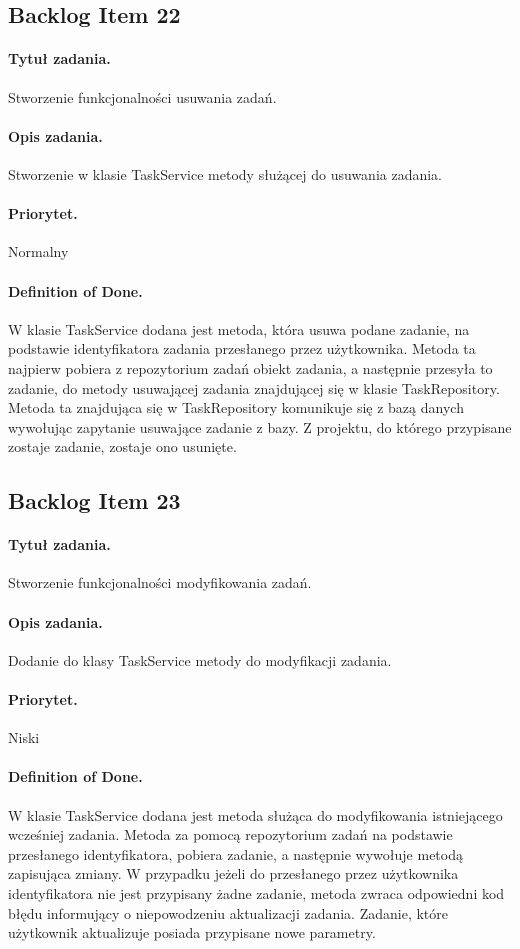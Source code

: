 ﻿\documentclass[a4paper]{article}
\begin{document}
\subsection{Backlog Item 22} 
\paragraph{Tytuł zadania.}  Stworzenie funkcjonalności usuwania zadań.
\paragraph{Opis zadania.} Stworzenie w klasie TaskService metody służącej do usuwania zadania. 
\paragraph{Priorytet.} Normalny
\paragraph{Definition of Done.} W klasie TaskService dodana jest metoda, która usuwa podane zadanie, na podstawie identyfikatora zadania przesłanego przez użytkownika. Metoda ta najpierw pobiera z repozytorium zadań obiekt zadania, a następnie przesyła to zadanie, do metody usuwającej zadania znajdującej się w klasie TaskRepository. Metoda ta znajdująca się w TaskRepository komunikuje się z bazą danych wywołując zapytanie usuwające zadanie z bazy. Z projektu, do którego przypisane zostaje zadanie, zostaje ono usunięte.

\subsection{Backlog Item 23} 
\paragraph{Tytuł zadania.} Stworzenie funkcjonalności modyfikowania zadań.
\paragraph{Opis zadania.} Dodanie do klasy TaskService metody do modyfikacji zadania.
\paragraph{Priorytet.} Niski
\paragraph{Definition of Done.} W klasie TaskService dodana jest metoda służąca do modyfikowania istniejącego wcześniej zadania. Metoda za pomocą repozytorium zadań na podstawie przesłanego identyfikatora, pobiera zadanie, a następnie wywołuje metodą zapisująca zmiany. W przypadku jeżeli do przesłanego przez użytkownika identyfikatora nie jest przypisany żadne zadanie, metoda zwraca odpowiedni kod błędu informujący o niepowodzeniu aktualizacji zadania. Zadanie, które użytkownik aktualizuje posiada przypisane nowe parametry.
\end{document}
